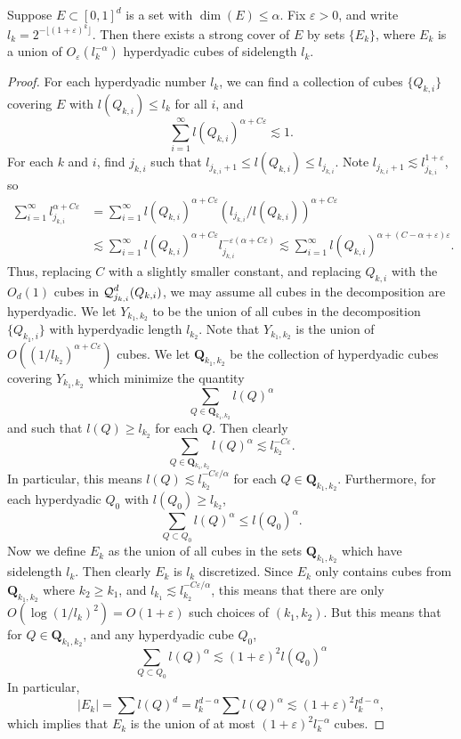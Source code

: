 \begin{theorem}
	Suppose $E \subset [0,1]^d$ is a set with $\dim(E) \leq \alpha$. Fix $\varepsilon > 0$, and write $l_k = 2^{-\lfloor (1 + \varepsilon)^k \rfloor}$. Then there exists a strong cover of $E$ by sets $\{ E_k \}$, where $E_k$ is a union of $O_\varepsilon(l_k^{-\alpha})$ hyperdyadic cubes of sidelength $l_k$.
\end{theorem}
\begin{proof}
	For each hyperdyadic number $l_k$, we can find a collection of cubes $\{ Q_{k,i} \}$ covering $E$ with $l(Q_{k,i}) \leq l_k$ for all $i$, and
	\[ \sum_{i = 1}^\infty l(Q_{k,i})^{\alpha + C\varepsilon} \lesssim 1. \]
	For each $k$ and $i$, find $j_{k,i}$ such that $l_{j_{k,i} + 1} \leq l(Q_{k,i}) \leq l_{j_{k,i}}$. Note $l_{j_{k,i} + 1} \lesssim l_{j_{k,i}}^{1 + \varepsilon}$, so
	\begin{align*}
		\sum_{i = 1}^\infty l_{j_{k,i}}^{\alpha + C\varepsilon} &= \sum_{i = 1}^\infty l(Q_{k,i})^{\alpha + C \varepsilon} (l_{j_{k,i}} / l(Q_{k,i}))^{\alpha + C\varepsilon}\\
		&\lesssim \sum_{i = 1}^\infty l(Q_{k,i})^{\alpha + C\varepsilon} l_{j_{k,i}}^{-\varepsilon(\alpha + C\varepsilon)} \lesssim \sum_{i = 1}^\infty l(Q_{k,i})^{\alpha + (C - \alpha + \varepsilon) \varepsilon}.
	\end{align*}
	Thus, replacing $C$ with a slightly smaller constant, and replacing $Q_{k,i}$ with the $O_d(1)$ cubes in $\operatorname{\mathcal{Q}}_{j_{k,i}}^d(Q_{k,i})$, we may assume all cubes in the decomposition are hyperdyadic. We let $Y_{k_1,k_2}$ to be the union of all cubes in the decomposition $\{ Q_{k_1,i} \}$ with hyperdyadic length $l_{k_2}$. Note that $Y_{k_1,k_2}$ is the union of $O((1/l_{k_2})^{\alpha + C\varepsilon})$ cubes. We let $\mathbf{Q}_{k_1,k_2}$ be the collection of hyperdyadic cubes covering $Y_{k_1,k_2}$ which minimize the quantity
	\[ \sum_{Q \in \mathbf{Q}_{k_1,k_2}} l(Q)^\alpha \]
	and such that $l(Q) \geq l_{k_2}$ for each $Q$. Then clearly
	\[ \sum_{Q \in \mathbf{Q}_{k_1,k_2}} l(Q)^\alpha \lesssim l_{k_2}^{- C\varepsilon}. \]
	In particular, this means $l(Q) \lesssim l_{k_2}^{-C\varepsilon/\alpha}$ for each $Q \in \mathbf{Q}_{k_1,k_2}$. Furthermore, for each hyperdyadic $Q_0$ with $l(Q_0) \geq l_{k_2}$,
	\[ \sum_{Q \subset Q_0} l(Q)^\alpha \leq l(Q_0)^\alpha. \]
	Now we define $E_k$ as the union of all cubes in the sets $\mathbf{Q}_{k_1,k_2}$ which have sidelength $l_k$. Then clearly $E_k$ is $l_k$ discretized. Since $E_k$ only contains cubes from $\mathbf{Q}_{k_1,k_2}$ where $k_2 \geq k_1$, and $l_{k_1} \lesssim l_{k_2}^{-C\varepsilon/\alpha}$, this means that there are only $O(\log(1/l_k)^2) = O(1 + \varepsilon)$ such choices of $(k_1,k_2)$. But this means that for $Q \in \mathbf{Q}_{k_1,k_2}$, and any hyperdyadic cube $Q_0$,
	\[ \sum_{Q \subset Q_0} l(Q)^\alpha \lesssim (1 + \varepsilon)^2 l(Q_0)^\alpha \]
	In particular,
	\[ |E_k| = \sum l(Q)^d = l_k^{d - \alpha} \sum l(Q)^\alpha \lesssim (1 + \varepsilon)^2 l_k^{d-\alpha}, \]
	which implies that $E_k$ is the union of at most $(1 + \varepsilon)^2 l_k^{-\alpha}$ cubes.
\end{proof}